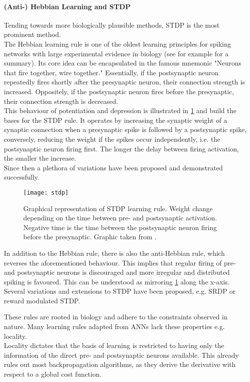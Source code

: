 \paragraph{(Anti-) Hebbian Learning and STDP}
Tending towards more biologically plausible methods, \ac{STDP} is the most prominent method.\\
The Hebbian learning rule is one of the oldest learning principles for spiking networks with large experimental evidence in biology (see for example \cite{feldman_spike-timing_2012} for a summary). Its core idea can be encapsulated in the famous mnemonic "Neurons that fire together, wire together." Essentially, if the postsynaptic neuron repeatedly fires shortly after the presynaptic neuron, their connection strength is increased. Oppositely, if the postsynaptic neuron fires before the presynaptic, their connection strength is decreased.\\
This behaviour of potentiation and depression is illustrated in \cref{fig:stdp} and build the bases for the \ac{STDP} rule. It operates by increasing the synaptic weight of a synaptic connection when a presynaptic spike is followed by a postsynaptic spike, conversely, reducing the weight if the spikes occur independently, i.e. the postsynaptic neuron firing first. The longer the delay between firing activation, the smaller the increase.\\
Since then a plethora of variations have been proposed and demonstrated successfully\cite{vigneron_critical_2020,tavanaei_bp-stdp_2019,yamazaki_spiking_2022}.
\begin{figure}
	\centering
	\texttt{[image: stdp]}
	\caption{Graphical representation of STDP learning rule. Weight change depending on the time between pre- and postsynaptic activation. Negative time is the time between the postsynaptic neuron firing before the presynaptic. Graphic taken from \cite{yi_learning_2023}.}
	\label{fig:stdp}
\end{figure}
In addition to the Hebbian rule, there is also the anti-Hebbian rule, which reverses the aforementioned behaviour. This implies that regular firing of pre- and postsynaptic neurons is discouraged and more irregular and distributed spiking is favoured. This can be understood as mirroring \cref{fig:stdp} along the x-axis.\\
Several variations and extensions to \ac{STDP} have been proposed, e.g. \ac{SRDP}\cite{kempter_hebbian_1999} or reward modulated \ac{STDP}\cite{legenstein_learning_2008}.

These rules are rooted in biology and adhere to the constraints observed in nature. Many learning rules adapted from \acp{ANN} lack these properties e.g. locality.\\
Locality dictates that the basis of learning is restricted to having only the information of the direct pre- and postsynaptic neurons available. This already rules out most backpropagation algorithms, as they derive the derivative with respect to a global cost function.


